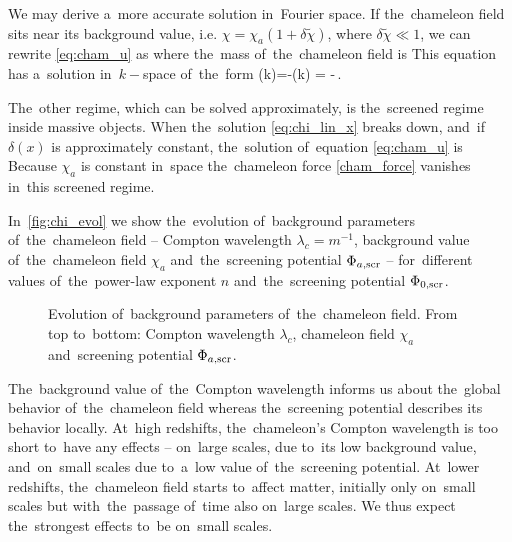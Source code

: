 We may derive a~more accurate solution in~Fourier space. If the~chameleon field sits near its background value, i.e. $\chi=\chi_a\left(1 + \delta\tilde\chi \right)$, where $\delta\tilde\chi \ll 1$, we can rewrite \eqref{eq:cham_u} as
where the~mass of~the~chameleon field is
This equation has a~solution in~$k-$space of~the~form
\eq
{
\label{eq:chi_lin_k}
	\hat{\chi}(k)=-\hat{\delta}(k) = -\frac{\beta\bar\rho}{\Mpl}\,.
}

The~other regime, which can be solved approximately, is the~screened regime inside massive objects. When the~solution \eqref{eq:chi_lin_x} breaks down, and~if $\delta(x)$ is approximately constant, the~solution of~equation \eqref{eq:cham_u} is
Because $\chi_a$ is constant in~space the~chameleon force \eqref{cham_force} vanishes in~this screened regime.

In~\autoref{fig:chi_evol} we show the~evolution of~background parameters of~the~chameleon field -- Compton wavelength $\lambda_c=m^{-1}$, background value of~the~chameleon field $\chi_a$ and~the~screening potential $\Phi_{a,\text{\scriptsize scr}}$ -- for~different values of~the~power-law exponent $n$ and~the~screening potential $\Phi_{0,\text{\scriptsize scr}}$.

\begin{figure}[hbt]
\centering
	\begin{subfigure}{1.0\textwidth}
	\end{subfigure}
	\begin{subfigure}{1.0\textwidth}
	\end{subfigure}
    \caption{Evolution of~background parameters of~the~chameleon field. From top to~bottom: Compton wavelength $\lambda_c$, chameleon field $\chi_a$ and~screening potential $\Phi_{a,\text{\scriptsize scr}}$.}
    \label{fig:chi_evol}
\end{figure}

The~background value of~the~Compton wavelength informs us about the~global behavior of~the~chameleon field whereas the~screening potential describes its behavior locally. At~high redshifts, the~chameleon's Compton wavelength is too short to~have any effects -- on~large scales, due to~its low background value, and~on~small scales due to~a~low value of~the~screening potential. At~lower redshifts, the~chameleon field starts to~affect matter, initially only on~small scales but with~the~passage of~time also on~large scales. We thus expect the~strongest effects to~be on~small scales.
